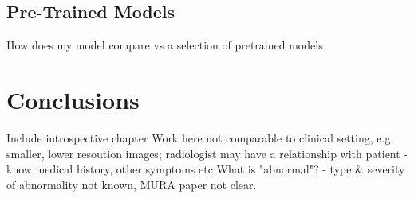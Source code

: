 \documentclass[11pt]{article} %
\theoremstyle{plain}
\theoremstyle{definition}
\begin{document}
\subsection{Pre-Trained Models}
How does my model compare vs a selection of pretrained models



\newpage
\section{Conclusions}
Include introspective chapter
Work here not comparable to clinical setting, e.g. smaller, lower resoution images; radiologist may have a relationship with patient - know medical history, other symptoms etc
What is "abnormal"? - type \& severity of abnormality not known, MURA paper not clear.



\newpage
\end{document}
